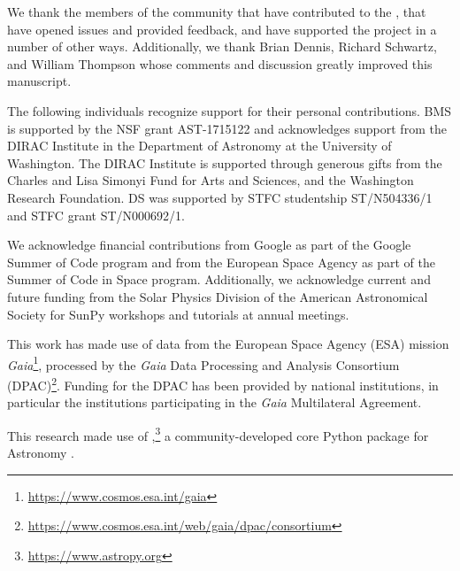 \acknowledgments

We thank the members of the community that have contributed to the \sunpyproj, that have opened issues and provided feedback, and have supported the project in a number of other ways.
Additionally, we thank Brian Dennis, Richard Schwartz, and William Thompson whose comments and discussion greatly improved this manuscript.

The following individuals recognize support for their personal contributions.
BMS is supported by the NSF grant AST-1715122 and acknowledges support from the DIRAC Institute in the Department of Astronomy at the University of Washington.
The DIRAC Institute is supported through generous gifts from the Charles and Lisa Simonyi Fund for Arts and Sciences, and the Washington Research Foundation.
DS was supported by STFC studentship ST/N504336/1 and STFC grant ST/N000692/1.

We acknowledge financial contributions from Google as part of the Google Summer of Code program and from the European Space Agency as part of the Summer of Code in Space program.
Additionally, we acknowledge current and future funding from the Solar Physics Division of the American Astronomical Society for SunPy workshops and tutorials at annual meetings.

This work has made use of data from the European Space Agency (ESA) mission \textit{Gaia}\footnote{\url{https://www.cosmos.esa.int/gaia}}, processed by the \textit{Gaia} Data Processing and Analysis Consortium (DPAC)\footnote{\url{https://www.cosmos.esa.int/web/gaia/dpac/consortium}}.
Funding for the DPAC has been provided by national institutions, in particular the institutions participating in the {\it Gaia} Multilateral Agreement.

This research made use of \astropypkg,\footnote{\url{https://www.astropy.org}} a community-developed core Python package for Astronomy \citep{astropy2013, astropy2018}.

